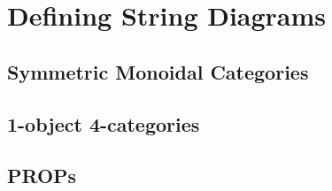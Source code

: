 \section{Defining String Diagrams}

\subsection{Symmetric Monoidal Categories}

\subsection{1-object 4-categories}

\subsection{PROPs}